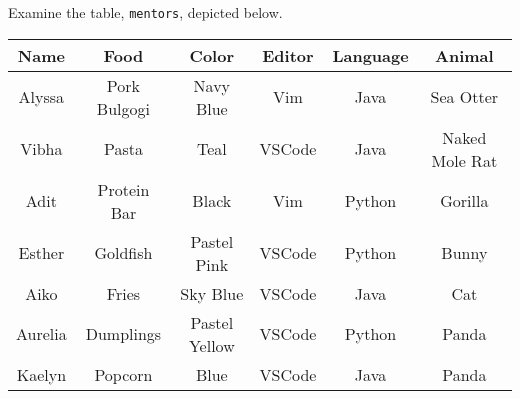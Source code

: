 Examine the table, \texttt{mentors}, depicted below.

\begin{center}
\begin{tabular}{|c|c|c|c|c|c|}
 \hline
 \textbf{Name} & \textbf{Food} & \textbf{Color} & \textbf{Editor} & \textbf{Language} & \textbf{Animal}\\
 \hline
 Alyssa & Pork Bulgogi & Navy Blue & Vim & Java & Sea Otter\\
 \hline
 Vibha & Pasta & Teal & VSCode & Java & Naked Mole Rat\\
 \hline
 Adit & Protein Bar & Black & Vim & Python & Gorilla\\
 \hline
 Esther & Goldfish & Pastel Pink & VSCode & Python & Bunny\\
 \hline
 Aiko & Fries & Sky Blue & VSCode & Java & Cat\\
 \hline
 Aurelia & Dumplings & Pastel Yellow & VSCode & Python & Panda\\
 \hline
 Kaelyn & Popcorn & Blue & VSCode & Java & Panda\\
 \hline
\end{tabular}
\end{center}
